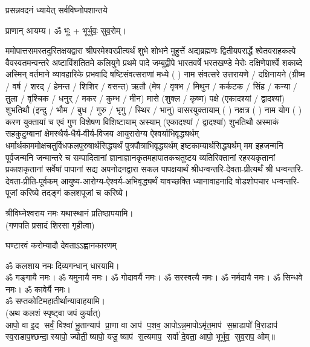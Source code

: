 {प्रसन्नवदनं ध्यायेत् सर्वविघ्नोपशान्तये}
 
प्राणान्  आयम्य।  ॐ भूः + भूर्भुवः॒ सुव॒रोम्।


ममोपात्तसमस्तदुरितक्षयद्वारा श्रीपरमेश्वरप्रीत्यर्थं शुभे शोभने मुहुर्त्ते अद्यब्रह्मणः
द्वितीयपरार्द्धे श्वेतवराहकल्पे वैवस्वतमन्वन्तरे अष्टाविंशतितमे कलियुगे प्रथमे पादे
जम्बूद्वीपे भारतवर्षे भरतखण्डे मेरोः दक्षिणेपार्श्वे शकाब्दे अस्मिन् वर्तमाने व्यावहारिके
 प्रभवादि षष्टिसंवत्सराणां मध्ये (  ) नाम संवत्सरे उत्तरायणे / दक्षिनायने 
(ग्रीष्म / वर्ष / शरद् / हेमन्त / शिशिर / वसन्त) ऋतौ  (मेष / वृषभ / मिथुन / कर्कटक / सिंह / कन्या / तुला / 
वृश्चिक / धनुर् / मकर / कुम्भ / मीन) मासे (शुक्ल / कृष्ण) पक्षे (एकादश्यां / द्वादश्यां) शुभतिथौ
(इन्दु / भौम / बुध / गुरु / भृगु / स्थिर / भानु) वासरयुक्तायाम्
(  ) नक्षत्र (  ) नाम  योग  (  ) करण युक्तायां च एवं गुण विशेषण विशिष्टायाम्
अस्याम् (एकादश्यां / द्वादश्यां) शुभतिथौ 
अस्माकं सहकुटुम्बानां क्षेमस्थैर्य-धैर्य-वीर्य-विजय आयुरारोग्य ऐश्वर्याभिवृद्ध्यर्थम्
 धर्मार्थकाममोक्ष\-चतुर्विधफलपुरुषार्थसिद्ध्यर्थं पुत्रपौत्राभि\-वृद्ध्यर्थम् इष्टकाम्यार्थसिद्ध्यर्थम्
मम इहजन्मनि पूर्वजन्मनि जन्मान्तरे च सम्पादितानां ज्ञानाज्ञानकृतमहा\-पातकचतुष्टय
व्यतिरिक्तानां रहस्यकृतानां प्रकाशकृतानां सर्वेषां पापानां सद्य अपनोदनद्वारा सकल 
पापक्षयार्थं
श्रीधन्वन्तरि-देवता-प्रीत्यर्थं श्री धन्वन्तरि-देवता-प्रीति-पूर्वकम् आयुष्य-आरोग्य-ऐश्वर्य-अभिवृद्ध्यर्थं 
यावच्छक्ति ध्यानावाहनादि 
षोडशोपचार धन्वन्तरि-पूजां करिष्ये तदङ्गं कलशपूजां च करिष्ये।


श्रीविघ्नेश्वराय नमः यथास्थानं प्रतिष्ठापयामि।\\
(गणपति प्रसादं शिरसा गृहीत्वा)


{घण्टारवं करोम्यादौ देवताऽऽह्वानकारणम्}

ॐ कलशाय नमः दिव्यगन्धान् धारयामि।\\
ॐ गङ्गायै नमः। ॐ यमुनायै नमः। ॐ गोदावर्यै नमः।  ॐ सरस्वत्यै नमः। ॐ नर्मदायै नमः। ॐ सिन्धवे नमः। ॐ कावेर्यै नमः।\\
 ॐ सप्तकोटिमहातीर्थान्यावाहयामि। \\

(अथ कलशं स्पृष्ट्वा जपं कुर्यात्) \\
आपो॒ वा इ॒द सर्वं॒ विश्वा॑ भू॒तान्याप॑ प्रा॒णा वा आप॑ प॒शव॒ आपो\-ऽन्न॒मापोऽमृ॑त॒माप॑ स॒म्राडापो॑ वि॒राडाप॑ स्व॒राडाप॒श्\-छन्दा॒स्यापो॒ ज्योती॒ष्यापो॒ यजू॒ष्याप॑ स॒त्यमाप॒ सर्वा॑ दे॒वता॒ आपो॒ भूर्भुव॒ सुव॒राप॒ ओम्॥\\


